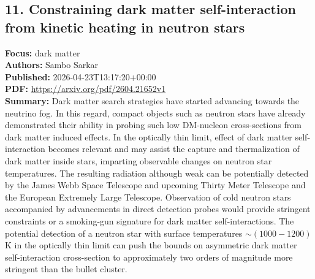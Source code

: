\documentclass[11pt]{article}
\begin{document}
\subsection*{11. Constraining dark matter self-interaction from kinetic heating in neutron stars}
\textbf{Focus:} dark matter\\
\textbf{Authors:} Sambo Sarkar\\
\textbf{Published:} 2026-04-23T13:17:20+00:00\\
\textbf{PDF:} \href{https://arxiv.org/pdf/2604.21652v1}{https://arxiv.org/pdf/2604.21652v1}\\
\textbf{Summary:}
Dark matter search strategies have started advancing towards the neutrino fog. In this regard, compact objects such as neutron stars have already demonstrated their ability in probing such low DM-nucleon cross-sections from dark matter induced effects. In the optically thin limit, effect of dark matter self-interaction becomes relevant and may assist the capture and thermalization of dark matter inside stars, imparting observable changes on neutron star temperatures. The resulting radiation although weak can be potentially detected by the James Webb Space Telescope and upcoming Thirty Meter Telescope and the European Extremely Large Telescope. Observation of cold neutron stars accompanied by advancements in direct detection probes would provide stringent constraints or a smoking-gun signature for dark matter self-interactions. The potential detection of a neutron star with surface temperatures $\sim (1000 - 1200)$ K in the optically thin limit can push the bounds on asymmetric dark matter self-interaction cross-section to approximately two orders of magnitude more stringent than the bullet cluster.
\newpage
\end{document}
